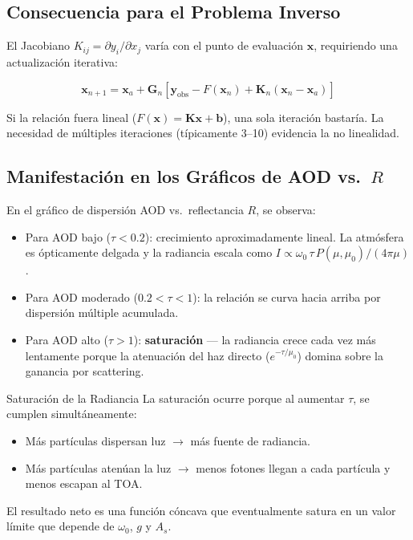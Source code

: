 \documentclass[a4paper,11pt]{article}
\begin{document}
\subsection{Consecuencia para el Problema Inverso}

El Jacobiano $K_{ij} = \partial y_i / \partial x_j$ var\'ia con el punto
de evaluaci\'on $\mathbf{x}$, requiriendo una actualizaci\'on iterativa:

\begin{equation}
    \mathbf{x}_{n+1} = \mathbf{x}_a + \mathbf{G}_n
    \left[\mathbf{y}_{\text{obs}} - F(\mathbf{x}_n) +
    \mathbf{K}_n(\mathbf{x}_n - \mathbf{x}_a)\right]
\end{equation}

Si la relaci\'on fuera lineal ($F(\mathbf{x}) = \mathbf{K}\mathbf{x} + \mathbf{b}$),
una sola iteraci\'on bastar\'ia.  La necesidad de m\'ultiples iteraciones
(t\'ipicamente 3--10) evidencia la no linealidad.

\subsection{Manifestaci\'on en los Gr\'aficos de AOD vs.\ $R$}

En el gr\'afico de dispersi\'on AOD vs.\ reflectancia $R$, se observa:
\begin{itemize}
    \item Para AOD bajo ($\tau < 0.2$): crecimiento aproximadamente lineal.
          La atm\'osfera es \'opticamente delgada y la radiancia escala como
          $I \propto \omega_0\,\tau\,P(\mu,\mu_0)/(4\pi\mu)$.

    \item Para AOD moderado ($0.2 < \tau < 1$): la relaci\'on se curva hacia
          arriba por dispersi\'on m\'ultiple acumulada.

    \item Para AOD alto ($\tau > 1$): \textbf{saturaci\'on} --- la radiancia
          crece cada vez m\'as lentamente porque la atenuaci\'on del haz directo
          ($e^{-\tau/\mu_0}$) domina sobre la ganancia por scattering.
\end{itemize}

\begin{concept}{Saturaci\'on de la Radiancia}
La saturaci\'on ocurre porque al aumentar $\tau$, se cumplen simult\'aneamente:
\begin{itemize}
    \item M\'as part\'iculas dispersan luz $\to$ m\'as fuente de radiancia.
    \item M\'as part\'iculas aten\'uan la luz $\to$ menos fotones llegan a cada
          part\'icula y menos escapan al TOA.
\end{itemize}
El resultado neto es una funci\'on c\'oncava que eventualmente satura en un
valor l\'imite que depende de $\omega_0$, $g$ y $A_s$.
\end{concept}
\end{document}
